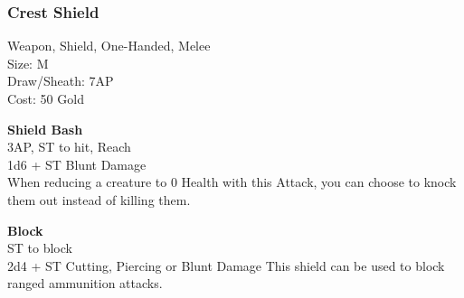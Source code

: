 \subsubsection{Crest Shield}\label{weapon:crestShield}
Weapon, Shield, One-Handed, Melee\\
Size: M\\
Draw/Sheath: 7AP\\
Cost: 50 Gold

\textbf{Shield Bash}\\
3AP, ST to hit,  Reach\\
1d6 + \texttimes ST Blunt Damage\\
When reducing a creature to 0 Health with this Attack, you can choose to knock them out instead of killing them.

\textbf{Block}\\
ST to block\\
2d4 + \texttimes ST Cutting, Piercing or Blunt Damage
This shield can be used to block ranged ammunition attacks.\\

